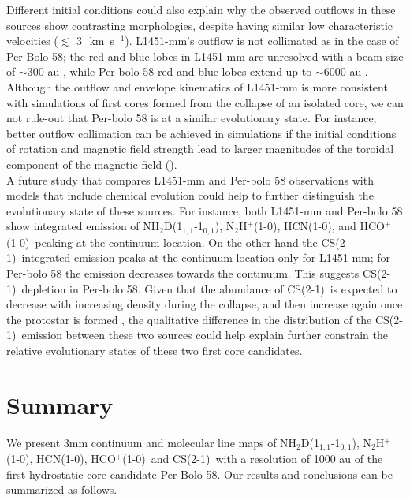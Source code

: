 \documentclass[iop]{emulateapj}
\newcommand{\kms}{\,~km~s$^{-1}$}
\newcommand{\nhtd}{\mbox{\rm NH$_2$D(1$_{1,1}$-1$_{0,1}$)}}
\newcommand{\nthp}{\mbox{\rm N$_2$H$^+$(1-0)}}
\newcommand{\hcn}{\mbox{\rm HCN(1-0)}}
\newcommand{\hcop}{\mbox{\rm  HCO$^+$(1-0)}}
\newcommand{\cs}{\mbox{\rm CS(2-1)}}
\begin{document}
Different initial conditions could also explain why the observed outflows in these sources show contrasting morphologies, despite having similar low characteristic velocities ($\lesssim$ 3\kms). L1451-mm's outflow is not collimated as in the case of Per-Bolo 58; the red and blue lobes in L1451-mm are unresolved with a beam size of $\sim$300 au \citep{2011PinedaEnigmatic}, while Per-bolo 58 red and blue lobes extend up to $\sim$6000 au \citep{2011DunhamDetection}. Although the outflow and envelope kinematics of L1451-mm is more consistent with simulations of first cores formed from the collapse of an isolated core, we can not rule-out that Per-bolo 58 is at a similar evolutionary state. For instance, better outflow collimation can be achieved in simulations if the initial conditions of rotation and magnetic field strength lead to larger magnitudes of the toroidal component of the magnetic field (\citealt{2002TomisakaCollapse,2012SeifriedMagnetic}).\\

A future study that compares L1451-mm and Per-bolo 58 observations with models that include chemical evolution could help to further distinguish the evolutionary state of these sources. For instance, both L1451-mm and Per-bolo 58 show integrated emission of \nhtd, \nthp, \hcn, and \hcop\ peaking at the continuum location. On the other hand the \cs\ integrated emission peaks at the continuum location only for L1451-mm; for Per-bolo 58 the emission decreases towards the continuum. This suggests \cs\ depletion in Per-bolo 58. Given that the abundance of \cs\ is expected to decrease with increasing density during the collapse, and then increase again once the protostar is formed \citep{2004LeeEvolution}, the qualitative difference in the distribution of the \cs\ emission between these two sources could help explain further constrain the relative evolutionary states of these two first core candidates.







\section{Summary}

We present 3mm continuum and molecular line maps of  \nhtd, \nthp, \hcn, \hcop\ and \cs\ with a resolution of 1000 au of the first hydrostatic core candidate Per-Bolo 58. Our results and conclusions can be summarized as follows.
\end{document}
